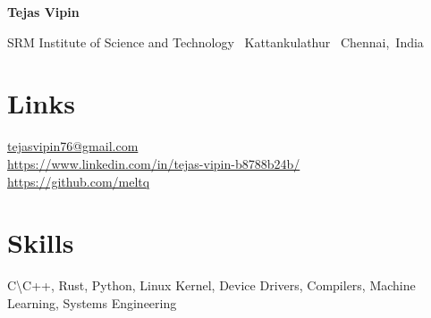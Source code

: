 \documentclass{OpenCV}
\newlength{\hvspace}
\begin{document}
\begin{center}
    \noindent\textbf{\LARGE Tejas Vipin} \\
\end{center}
\vspace{\hvspace}
\hrulefill
\vspace{\hvspace}
\begin{center}
    \noindent SRM Institute of Science and Technology \textbullet\ Kattankulathur \textbullet\ Chennai,\, India \\
\end{center}
\vspace{\hvspace}
\vspace{-4pt}
\hrulefill
\vspace{-12pt}

\section*{Links}
\faEnvelopeO\enskip \href{mailto:tejasvipin76@gmail.com}{tejasvipin76@gmail.com} \\
\faLinkedin\enskip\href{https://www.linkedin.com/in/tejas-vipin-b8788b24b/}{https://www.linkedin.com/in/tejas-vipin-b8788b24b/} \\
\faGithub\enskip\href{https://github.com/meltq}{https://github.com/meltq} \\

\section*{Skills}
C{\textbackslash}C++, Rust, Python, Linux Kernel, Device Drivers, Compilers, Machine Learning, Systems Engineering
% 









\end{document}
